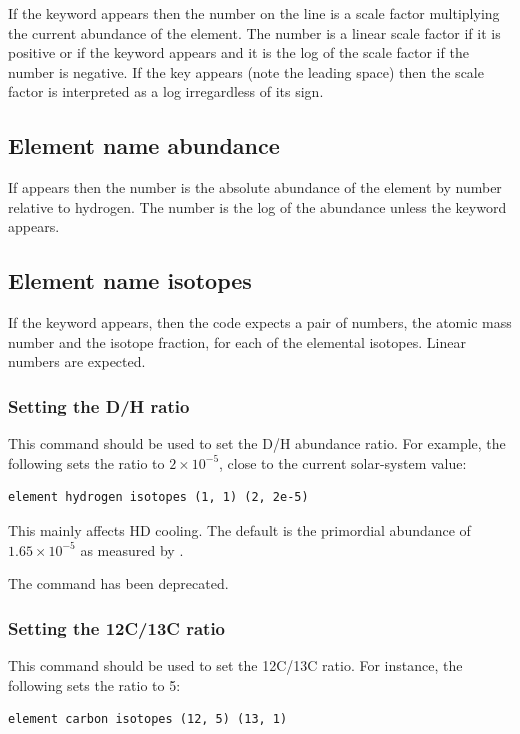 If the keyword  appears
then the number on the line is a scale factor
multiplying the current abundance of the element.
The number is a linear
scale factor if it is positive or if the 
keyword appears and it is
the log of the scale factor if the number is negative.
If the key 
appears (note the leading space) then the scale factor
is interpreted as
a log irregardless of its sign.

\subsection{Element name abundance}

If  appears then the number is
the absolute abundance of the
element by number relative to hydrogen.
The number is the log of the
abundance unless the  keyword appears.

\subsection{Element name isotopes}

If the keyword  appears, then
the code expects a pair of numbers, the atomic mass
number and the isotope fraction, for each of the
elemental isotopes.
Linear numbers are expected.

\subsubsection{Setting the D/H ratio}

This command should be used to set the D/H abundance ratio.
For example, the following sets the ratio to $2\times 10^{-5}$,
close to the current solar-system value:
%
\begin{verbatim}
element hydrogen isotopes (1, 1) (2, 2e-5)
\end{verbatim}

This mainly affects HD cooling.
The default is the primordial abundance of $1.65 \times 10^{-5}$
as measured by \citet{Pettini2001}.

The command  has been deprecated.

\subsubsection{Setting the 12C/13C ratio}

This command should be used to set the 12C/13C ratio.
For instance, the following sets the ratio to 5:
%
\begin{verbatim}
element carbon isotopes (12, 5) (13, 1)
\end{verbatim}
%

